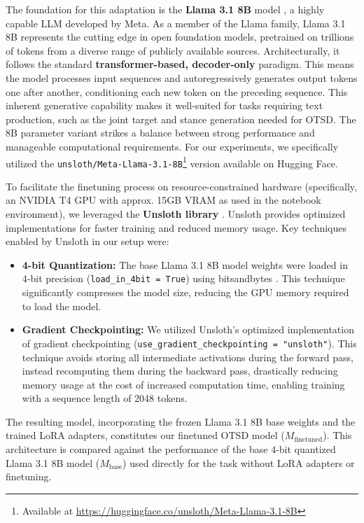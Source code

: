 \documentclass[twocolumn,11pt,letterpaper]{article}
\begin{document}
The foundation for this adaptation is the \textbf{Llama 3.1 8B} model \cite{llama3.1}, a highly capable LLM developed by Meta. As a member of the Llama family, Llama 3.1 8B represents the cutting edge in open foundation models, pretrained on trillions of tokens from a diverse range of publicly available sources. Architecturally, it follows the standard \textbf{transformer-based, decoder-only} paradigm. This means the model processes input sequences and autoregressively generates output tokens one after another, conditioning each new token on the preceding sequence. This inherent generative capability makes it well-suited for tasks requiring text production, such as the joint target and stance generation needed for OTSD. The 8B parameter variant strikes a balance between strong performance and manageable computational requirements. For our experiments, we specifically utilized the \texttt{unsloth/Meta-Llama-3.1-8B}\footnote{Available at \url{https://huggingface.co/unsloth/Meta-Llama-3.1-8B}} version available on Hugging Face.

To facilitate the finetuning process on resource-constrained hardware (specifically, an NVIDIA T4 GPU with approx. 15GB VRAM as used in the notebook environment), we leveraged the \textbf{Unsloth library} \cite{unsloth}. Unsloth provides optimized implementations for faster training and reduced memory usage. Key techniques enabled by Unsloth in our setup were:
\begin{itemize}
    \item \textbf{4-bit Quantization:} The base Llama 3.1 8B model weights were loaded in 4-bit precision (\texttt{load\_in\_4bit = True}) using bitsandbytes \cite{bitsandbytes}. This technique significantly compresses the model size, reducing the GPU memory required to load the model.
    \item \textbf{Gradient Checkpointing:} We utilized Unsloth's optimized implementation of gradient checkpointing (\texttt{use\_gradient\_checkpointing = "unsloth"}). This technique avoids storing all intermediate activations during the forward pass, instead recomputing them during the backward pass, drastically reducing memory usage at the cost of increased computation time, enabling training with a sequence length of 2048 tokens.
\end{itemize}

The resulting model, incorporating the frozen Llama 3.1 8B base weights and the trained LoRA adapters, constitutes our finetuned OTSD model ($M_{\text{finetuned}}$). This architecture is compared against the performance of the base 4-bit quantized Llama 3.1 8B model ($M_{\text{base}}$) used directly for the task without LoRA adapters or finetuning.
\end{document}

